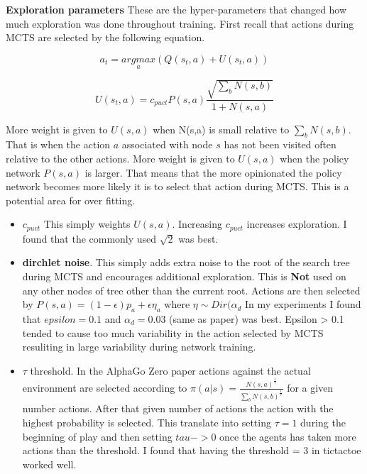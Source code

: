 \textbf{Exploration parameters}
These are the hyper-parameters that changed how much exploration was done throughout training. First recall that actions during MCTS are selected by the following equation. 

\begin{equation}
    a_{t} = \underset{a}{argmax}(Q(s_{t},a) + U(s_{t},a))
\end{equation}

\begin{equation}
    U(s_{t},a) = c_{puct}P(s,a) \frac{\sqrt{\sum_{b}N(s,b)}}{1 + N(s,a)}
\end{equation}

More weight is given to $U(s,a)$ when N(s,a) is small relative to $\sum_{b}N(s,b)$. That is when the action $a$ associated with node $s$ has not been visited often relative to the other actions. More weight is given to $U(s,a)$ when the policy network $P(s,a)$ is larger. That means that the more opinionated the policy network becomes more likely it is to select that action during MCTS. This is a potential area for over fitting. 

\begin{itemize}
    \item \textbf{$c_{puct}$} This simply weights $U(s,a)$. Increasing $c_{puct}$ increases exploration. I found that the commonly used $\sqrt{2}$ was best. 
    \item \textbf{dirchlet noise}. This simply adds extra noise to the root of the search tree during MCTS and encourages additional exploration. This is \textbf{Not} used on any other nodes of tree other than the current root. Actions are then selected by
    $P(s,a) = (1 - \epsilon)p_{a} + \epsilon \eta_{a}$ where $\eta \sim Dir(\alpha_{d}$
    In my experiments I found that $epsilon = 0.1$ and $\alpha_{d}=0.03$ (same as paper) was best. Epsilon > 0.1 tended to cause too much variability in the action selected by MCTS resuliting in large variability during network training. 
    \item $\tau $ threshold. In the AlphaGo Zero paper actions against the actual environment are selected according to $\pi(a|s) = \frac{N(s,a)^{\frac{1}{\tau}}}{\sum_{b}N(s,b)^{\frac{1}{\tau}}}$ for a given number actions. After that given number of actions the action with the highest probability is selected. This translate into setting $\tau = 1$ during the beginning of play and then setting $tau -> 0$ once the agents has taken more actions than the threshold. I found that having the threshold = 3 in tictactoe worked well. 
\end{itemize}

